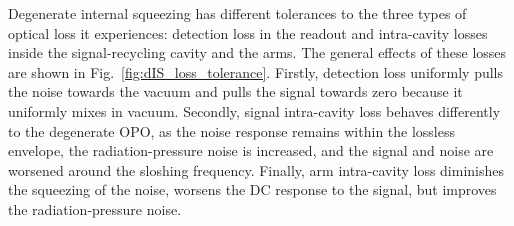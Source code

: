 Degenerate internal squeezing has different tolerances to the three types of optical loss it experiences: detection loss in the readout and intra-cavity losses inside the signal-recycling cavity and the arms. %
The general effects of these losses are shown in Fig.~\ref{fig:dIS_loss_tolerance}. Firstly, detection loss uniformly pulls the noise towards the vacuum and pulls the signal towards zero because it uniformly mixes in vacuum. Secondly, signal intra-cavity loss behaves differently to the degenerate OPO, as the noise response remains within the lossless envelope, the radiation-pressure noise is increased, and the signal and noise are worsened around the sloshing frequency. Finally, arm intra-cavity loss diminishes the squeezing of the noise, worsens the DC response to the signal, but improves the radiation-pressure noise.

